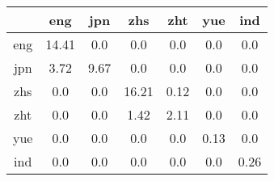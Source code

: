 \documentclass{article}
\begin{document}
\centering
\begin{table}[!h]

\begin{tabular}{|c|c|c|c|c|c|c|}
\hline 

& eng & jpn & zhs & zht & yue & ind \\
\hline 
eng & 14.41 & 0.0 & 0.0 & 0.0 & 0.0 & 0.0 \\
\hline 
jpn & 3.72 & 9.67 & 0.0 & 0.0 & 0.0 & 0.0 \\
\hline 
zhs & 0.0 & 0.0 & 16.21 & 0.12 & 0.0 & 0.0 \\
\hline 
zht & 0.0 & 0.0 & 1.42 & 2.11 & 0.0 & 0.0 \\
\hline 
yue & 0.0 & 0.0 & 0.0 & 0.0 & 0.13 & 0.0 \\
\hline 
ind & 0.0 & 0.0 & 0.0 & 0.0 & 0.0 & 0.26 \\
\hline

\end{tabular}
\end{table}
\end{document}
